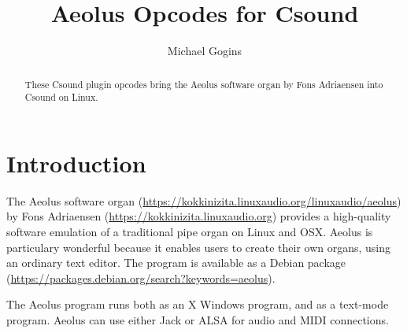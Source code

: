 \documentclass[english,11pt,letterpaper,onecolumn]{scrartcl}
\title{Aeolus Opcodes for Csound}
\author{Michael Gogins}
\begin{document}

\maketitle

\begin{abstract}
	These Csound plugin opcodes bring the Aeolus software organ by Fons Adriaensen into Csound on Linux.
\end{abstract}

\section{Introduction}

The Aeolus software organ
(\url{https://kokkinizita.linuxaudio.org/linuxaudio/aeolus}) by Fons Adriaensen
(\url{https://kokkinizita.linuxaudio.org}) provides a high-quality software
emulation of a traditional pipe organ on Linux and OSX. Aeolus is particulary
wonderful because it enables users to create their own organs, using an ordinary
text editor. The program is available as a Debian package
(\url{https://packages.debian.org/search?keywords=aeolus}).

The Aeolus program runs both as an X Windows program, and as a text-mode
program. Aeolus can use either Jack or ALSA for audio and MIDI connections.
\end{document}

